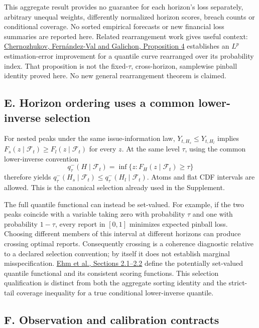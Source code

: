This aggregate result provides no guarantee for each horizon's loss
separately, arbitrary unequal weights, differently normalized horizon scores,
breach counts or conditional coverage. No sorted empirical forecasts or new
financial loss summaries are reported here. Related rearrangement work gives
useful context: \href{https://arxiv.org/pdf/0704.3649}{Chernozhukov,
Fern\'andez-Val and Galichon, Proposition 4} establishes an \(L^p\)
estimation-error improvement for a quantile curve rearranged over its
probability index. That proposition is not the fixed-\(\tau\), cross-horizon,
samplewise pinball identity proved here. No new general rearrangement theorem
is claimed.

\subsection*{E. Horizon ordering uses a common lower-inverse selection}

For nested peaks under the same issue-information law,
\(Y_{t,H_s}\le Y_{t,H_l}\) implies
\(F_s(z\mid\mathcal F_t)\ge F_l(z\mid\mathcal F_t)\) for every \(z\).
At the same level \(\tau\), using the common lower-inverse convention
\[
q^-_\tau(H\mid\mathcal F_t)
=\inf\{z:F_H(z\mid\mathcal F_t)\ge\tau\}
\]
therefore yields
\(q^-_\tau(H_s\mid\mathcal F_t)\le
q^-_\tau(H_l\mid\mathcal F_t)\). Atoms and flat CDF intervals are allowed.
This is the canonical selection already used in the Supplement.

The full quantile functional can instead be set-valued. For example, if the
two peaks coincide with a variable taking zero with probability \(\tau\) and
one with probability \(1-\tau\), every report in \([0,1]\) minimizes expected
pinball loss. Choosing different members of this interval at different
horizons can produce crossing optimal reports. Consequently crossing is a
coherence diagnostic relative to a declared selection convention; by itself
it does not establish marginal misspecification.
\href{https://arxiv.org/pdf/1503.08195v2}{Ehm et al., Sections 2.1--2.2}
define the potentially set-valued quantile functional and its consistent
scoring functions. This selection qualification is distinct from both the
aggregate sorting identity and the strict-tail coverage inequality for a true
conditional lower-inverse quantile.


\subsection*{F. Observation and calibration contracts}

